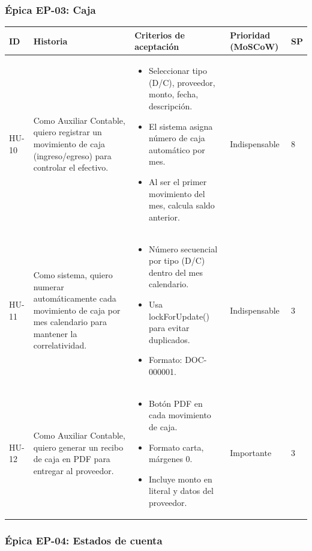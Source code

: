 \documentclass[stu]{apa7}
\begin{document}
\subsubsection{Épica EP-03: Caja}

\begin{longtable}{|L{0.8cm}|L{4.5cm}|L{3.5cm}|L{2cm}|L{1.5cm}|}
\hline
{}
\textbf{ID} & \textbf{Historia} & \textbf{Criterios de aceptación} & \textbf{Prioridad (MoSCoW)} & \textbf{SP} \\
\hline
\endhead
HU-10 & Como Auxiliar Contable, quiero registrar un movimiento de caja (ingreso/egreso) para controlar el efectivo. & 
\begin{itemize}[nosep]
    \item Seleccionar tipo (D/C), proveedor, monto, fecha, descripción.
    \item El sistema asigna número de caja automático por mes.
    \item Al ser el primer movimiento del mes, calcula saldo anterior.
\end{itemize} & Indispensable & 8 \\
\hline
HU-11 & Como sistema, quiero numerar automáticamente cada movimiento de caja por mes calendario para mantener la correlatividad. & 
\begin{itemize}[nosep]
    \item Número secuencial por tipo (D/C) dentro del mes calendario.
    \item Usa lockForUpdate() para evitar duplicados.
    \item Formato: DOC-000001.
\end{itemize} & Indispensable & 3 \\
\hline
HU-12 & Como Auxiliar Contable, quiero generar un recibo de caja en PDF para entregar al proveedor. & 
\begin{itemize}[nosep]
    \item Botón PDF en cada movimiento de caja.
    \item Formato carta, márgenes 0.
    \item Incluye monto en literal y datos del proveedor.
\end{itemize} & Importante & 3 \\
\hline
\end{longtable}

\newpage

\subsubsection{Épica EP-04: Estados de cuenta}
\end{document}
